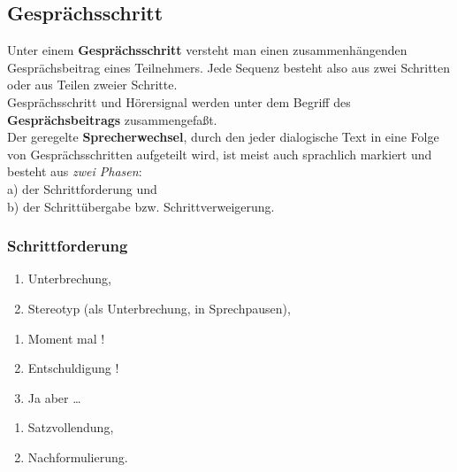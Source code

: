 \documentclass[
  letterpaper,
]{scrbook}
\providecommand{\tightlist}{%
  \setlength{\itemsep}{0pt}\setlength{\parskip}{0pt}}\usepackage{longtable,booktabs,array}
\begin{document}
\hypertarget{gespruxe4chsschritt}{%
\subsection{Gesprächsschritt}\label{gespruxe4chsschritt}}

Unter einem \textbf{Gesprächsschritt} versteht man einen
zusammenhängenden Gesprächsbeitrag eines Teilnehmers. Jede Sequenz
besteht also aus zwei Schritten oder aus Teilen zweier Schritte.\\

Gesprächsschritt und Hörersignal werden unter dem Begriff des
\textbf{Gesprächsbeitrags} zusammengefaßt.\\

Der geregelte \textbf{Sprecherwechsel}, durch den jeder dialogische Text
in eine Folge von Gesprächsschritten aufgeteilt wird, ist meist auch
sprachlich markiert und besteht aus \emph{zwei Phasen}:\\
a) der Schrittforderung und\\
b) der Schrittübergabe bzw. Schrittverweigerung.\\

\hypertarget{schrittforderung}{%
\subsubsection{Schrittforderung}\label{schrittforderung}}

\begin{enumerate}
\def\labelenumi{\alph{enumi})}
\tightlist
\item
  Unterbrechung,\\
\item
  Stereotyp (als Unterbrechung, in Sprechpausen),\\
\end{enumerate}

\begin{enumerate}
\def\labelenumi{(\arabic{enumi})}
\setcounter{enumi}{34}
\tightlist
\item
  Moment mal !\\
\item
  Entschuldigung !\\
\item
  Ja aber \ldots{}\\
\end{enumerate}

\begin{enumerate}
\def\labelenumi{\alph{enumi})}
\setcounter{enumi}{2}
\tightlist
\item
  Satzvollendung,\\
\item
  Nachformulierung.\\
\end{enumerate}
\end{document}
